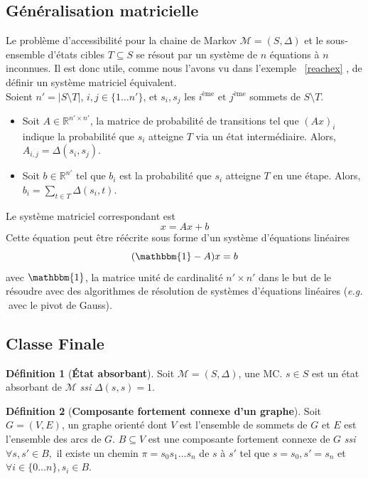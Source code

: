 \documentclass[12pt,a4paper]{report}
\theoremstyle{definition}
\newtheorem{definition}{Définition}[chapter]
\theoremstyle{remark}
\newcommand{\eg}{\textit{e.g.}}
\newcommand{\ssi}{\textit{ssi} }
\let\labelitemi\labelitemii
\begin{document}
\subsection{Généralisation matricielle}
Le problème d'accessibilité pour la chaine de Markov $\mathcal{M} = (S, \Delta)$ et le sous-ensemble d'états cibles $T \subseteq S$ se résout par un système de $n$ équations à $n$ inconnues. Il est donc utile, comme nous l'avons vu dans l'exemple ~\ref{reachex} , de définir un système matriciel équivalent. \\
Soient $n' = |S \setminus T|$, $i, j \in \{1 \dots n'\}$, et $s_i, s_j$ les $i^{\text{ème}} \text{ et } j^{\text{ème}} $ sommets de $S \setminus T$. 
\begin{itemize}
\renewcommand{\labelitemi}{\tiny$\bullet$}
\item Soit $A \in \mathbb{R}^{n' \times n'}$, la matrice de probabilité de transitions tel que $(Ax)_{i}$ indique la probabilité que $s_i$ atteigne $T$ via un état intermédiaire. Alors, $A_{i,j} = \Delta(s_i, s_j)$.
\item Soit $b \in \mathbb{R}^{n'}$ tel que $b_{i}$ est la probabilité que $s_i$ atteigne $T$ en une étape. Alors, $b_i = \sum_{t \in T} \Delta(s_i, t)$.
\end{itemize}
Le système matriciel correspondant est
\[ x = Ax + b \]
Cette équation peut être réécrite sous forme d'un système d'équations linéaires
\[ (\mathbbm{1} - A) x = b \]
avec $\mathbbm{1}$, la matrice unité de cardinalité $n' \times n'$ dans le but de le résoudre avec des algorithmes de résolution de systèmes d'équations linéaires (\eg $\;$avec le pivot de Gauss).

\subsection{Classe Finale}
\begin{definition}[\textbf{\'Etat absorbant}]
	Soit $\mathcal{M} = (S, \Delta)$, une MC. $s \in S$ est un état absorbant de $\mathcal{M}$ \ssi $\Delta(s, s) = 1$.
\end{definition}

\begin{definition}[\textbf{Composante fortement connexe d'un graphe}]
	Soit $G=(V, E)$, un graphe orienté dont $V$ est l'ensemble de sommets de $G$ et $E$ est l'ensemble des arcs de $G$. $B \subseteq V$ est une composante fortement connexe de $G$ \ssi $\forall s,s' \in B,$ il existe un chemin $\pi = s_0 s_1 \dots s_n$ de $s$ à $s'$ tel que $s = s_0 , s' = s_n$ et $\forall i \in \{0 \dots n\}, s_i \in B$.
\end{definition}
\end{document}
